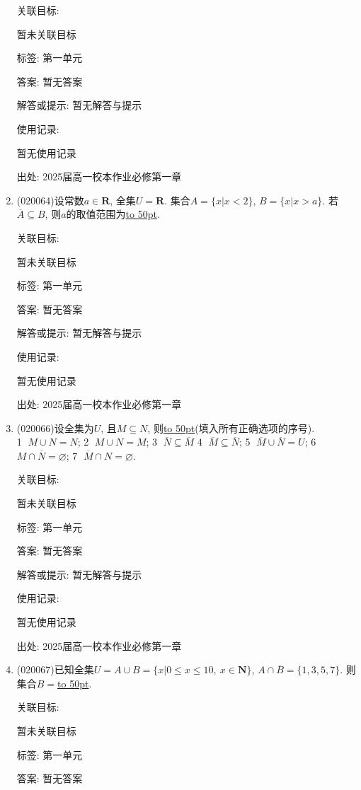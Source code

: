 \documentclass[10pt,a4paper]{article}
\newcommand{\blank}[1]{\underline{\hbox to #1pt{}}}
\begin{document}
\begin{enumerate}[1.]
关联目标:

暂未关联目标



标签: 第一单元

答案: 暂无答案

解答或提示: 暂无解答与提示

使用记录:

暂无使用记录


出处: 2025届高一校本作业必修第一章
\item { (020064)}设常数$a\in \mathbf{R}$, 全集$U=\mathbf{R}$. 集合$A=\{x| x<2 \}$, $B=\{x| x>a \}$. 若$\overline A\subseteq B$, 则$a$的取值范围为\blank{50}.


关联目标:

暂未关联目标



标签: 第一单元

答案: 暂无答案

解答或提示: 暂无解答与提示

使用记录:

暂无使用记录


出处: 2025届高一校本作业必修第一章
\item { (020066)}设全集为$U$, 且$M\subseteq N$, 则\blank{50}(填入所有正确选项的序号).\\
\textcircled{1} $M\cup N=N$; \textcircled{2} $M\cup N=M$; \textcircled{3} $\overline{N}\subseteq\overline{M}$ \textcircled{4} $\overline{M}\subseteq\overline{N}$; \textcircled{5} $\overline{M}\cup\overline{N}=U$; \textcircled{6} $M\cap\overline{N}=\varnothing$; \textcircled{7} $\overline{M}\cap N=\varnothing$.


关联目标:

暂未关联目标



标签: 第一单元

答案: 暂无答案

解答或提示: 暂无解答与提示

使用记录:

暂无使用记录


出处: 2025届高一校本作业必修第一章
\item { (020067)}已知全集$U=A\cup B=\{x|0\le x\le 10, \ x\in \mathbf{N}\}$, $A\cap\overline B=\{1, 3, 5, 7\}$. 则集合$B=$\blank{50}.


关联目标:

暂未关联目标



标签: 第一单元

答案: 暂无答案


\end{enumerate}
\end{document}
